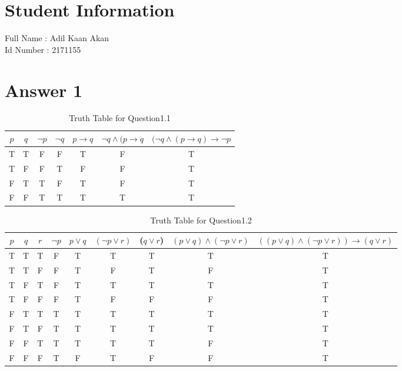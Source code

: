 \documentclass[12pt]{article}
\begin{document}
\section*{Student Information }
Full Name :  Adil Kaan Akan \\
Id Number :  2171155 \\

\section*{Answer 1}
\begin{table}[H]
\small
\centering
\caption{ Truth Table for Question1.1 }
\label{table:example}
\begin{tabular}{|c|c|c|c|c|c|c|}	%
\hline 							%
\textbf{$p$} & \textbf{$q$} & \textbf{$\neg p$} & \textbf{$\neg q$} & \textbf{$p \to q$} & \textbf{$\neg q \land (p \to q$} & \textbf{$(\neg q \land (p \to q) \to \neg p$}\\
\hline
\hline
T & T & F & F & T & F & T \\			%
T & F & F & T & F & F & T \\
F & T & T & F & T & F &  T \\
F & F & T & T  & T & T & T \\
\hline

\end{tabular}
\end{table}

\begin{table}[H]
\small
\centering
\caption{ Truth Table for Question1.2 }
\label{table:example}
\begin{tabular}{|c|c|c|c|c|c|c|c|c|}	%
\hline 							%
\textbf{$p$} & \textbf{$q$} & \textbf{$r$} & \textbf{$\neg p$} & \textbf{$p \lor q$}  & \textbf{$(\neg p \lor r)$}& \textbf($q \lor r$) & \textbf{$(p \lor q) \land (\neg p \lor r)$} & \textbf{$((p \lor q) \land (\neg p \lor r)) \to (q \lor r)$}\\
\hline
\hline
T & T & T & F & T & T & T & T & T\\			%
T & T & F & F & T & F & T & F & T \\
T & F & T & F & T & T & T & T & T\\
T & F & F & F & T & F & F & F & T\\
F & T & T & T & T & T & T & T & T\\
F & T & F & T & T & T & T & T & T\\
F & F & T & T & T & T & T & F & T\\
F & F & F & T & F & T & F & F & T\\
\hline

\end{tabular}
\end{table}
\end{document}
